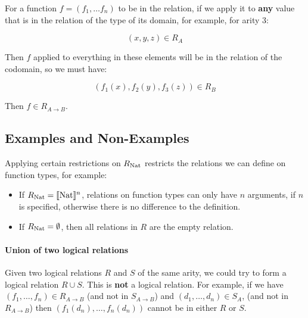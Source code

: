 For a function $f = (f_1, \dots f_n)$ to be in the relation, if we apply it to \textbf{any} value that is in the relation of the type of its domain, for example, for arity $3$:

\[ (x,y,z) \in R_A \]

Then $f$ applied to everything in these elements will be in the relation of the codomain, so we must have:

\[ (f_1(x),f_2(y),f_3(z)) \in R_B \]

Then $f \in R_{A \to B}$.

%
%
%
%
%
%

\subsection{Examples and Non-Examples}


Applying certain restrictions on $R_{\operatorname{Nat}}$ restricts the relations we can define on function types, for example:

\begin{itemize}
\item{If $R_{\operatorname{Nat}} = \llbracket \operatorname{Nat} \rrbracket^n$, relations on function types can only have $n$ arguments, if $n$ is specified, otherwise 
there is no difference to the definition.}
\item{If $R_{\operatorname{Nat}} = \emptyset$, then all relations in $R$ are the empty relation.}
\end{itemize}

\paragraph{Union of two logical relations}
Given two logical relations $R$ and $S$ of the same arity, we could try to form a logical relation $R \cup S$. This is \textbf{not} a logical relation. For example, if we have $(f_1, \dots , f_n) \in R_{A \to B}$ (and not in $S_{A \to B}$) and $(d_1, \dots , d_n) \in S_A$, (and not in $R_{A \to B}$)  then $(f_1(d_n), \dots , f_n(d_n))$ cannot be in either $R$ or $S$.

